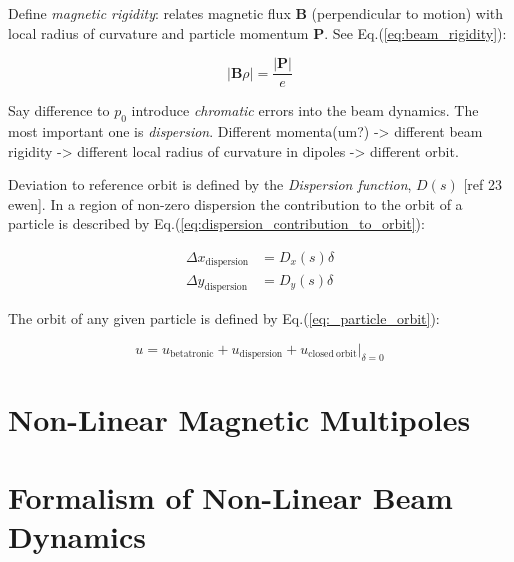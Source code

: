 Define \textit{magnetic rigidity}: relates magnetic flux $\mathbf{B}$ (perpendicular to motion) with local radius of curvature and particle momentum $\mathbf{P}$.
See Eq.(\ref{eq:beam_rigidity}):
\bigbreak

\begin{equation}
    \lvert \mathbf{B} \rho \rvert = \frac{\lvert \mathbf{P} \lvert}{e}
    \label{eq:beam_rigidity}
\end{equation}
\bigbreak

Say difference to $p_0$ introduce \emph{chromatic} errors into the beam dynamics.
The most important one is \emph{dispersion}.
Different momenta(um?) -> different beam rigidity -> different local radius of curvature in dipoles -> different orbit.

Deviation to reference orbit is defined by the \emph{Dispersion function}, $D(s)$ [ref 23 ewen].
In a region of non-zero dispersion the contribution to the orbit of a particle is described by Eq.(\ref{eq:dispersion_contribution_to_orbit}):
\bigbreak

\begin{equation}
    \begin{aligned}
    \Delta x_{\mathrm{dispersion}} &= D_{x}(s) \delta \\
    \Delta y_{\mathrm{dispersion}} &= D_{y}(s) \delta
    \end{aligned}
    \label{eq:dispersion_contribution_to_orbit}
\end{equation}
\bigbreak

The orbit of any given particle is defined by Eq.(\ref{eq:_particle_orbit}):
\bigbreak

\begin{equation}
    u = u_{\mathrm{betatronic}} + u_{\mathrm{dispersion}} + \left.u_{\mathrm{closed \ orbit}} \right|_{\delta = 0}
    \label{eq:_particle_orbit}
\end{equation}


\section{Non-Linear Magnetic Multipoles}


\section{Formalism of Non-Linear Beam Dynamics}

